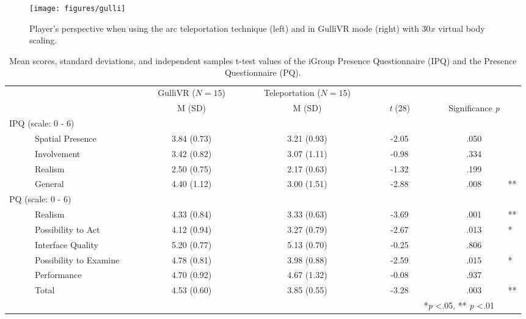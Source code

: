 \documentclass{sigchi}
\begin{document}
\begin{figure}
\centering
\texttt{[image: figures/gulli]}
\caption{Player's perspective when using the arc teleportation technique (left) and in GulliVR mode (right) with 30$x$ virtual body scaling.}
\label{fig:gulli}
\end{figure}

\begin{table*}[t]
  \caption{Mean scores, standard deviations, and independent samples t-test values of the iGroup Presence Questionnaire (IPQ) and the Presence Questionnaire (PQ).}
  \label{tab:IPQ}
  \begin{tabular}{lccccl}
    \toprule
     & ~~~~~~~GulliVR ($N = 15$) & ~~~~~~~Teleportation ($N = 15$) & ~~~~~~~ & ~~~~~~~ &\\
     \addlinespace 
      & ~~~~~~~M (SD)	& ~~~~~~~M (SD) & ~~~~~~~\textit{t} (28) & ~~~~~~~Significance \textit{p} & \\
    \midrule
    IPQ (scale: 0 - 6)\\
    \ \ \ \ \ \ Spatial Presence & ~~~~~~~3.84 (0.73) & ~~~~~~~3.21 (0.93) & ~~~~~~~-2.05 & ~~~~~~~.050 & \\
    \ \ \ \ \ \ Involvement & ~~~~~~~3.42 (0.82) & ~~~~~~~3.07 (1.11) & ~~~~~~~-0.98 & ~~~~~~~.334 &\\
    \ \ \ \ \ \ Realism & ~~~~~~~2.50 (0.75) & ~~~~~~~2.17 (0.63) & ~~~~~~~-1.32 & ~~~~~~~.199 &\\
    \ \ \ \ \ \ General & ~~~~~~~4.40 (1.12) & ~~~~~~~3.00 (1.51) & ~~~~~~~-2.88 & ~~~~~~~.008& **\\
    PQ (scale: 0 - 6)\\
    \ \ \ \ \ \ Realism & ~~~~~~~4.33 (0.84) & ~~~~~~~3.33 (0.63) & ~~~~~~~-3.69 & ~~~~~~~.001 & **\\
    \ \ \ \ \ \ Possibility to Act & ~~~~~~~4.12 (0.94) & ~~~~~~~3.27 (0.79) & ~~~~~~~-2.67 & ~~~~~~~.013& *\\
    \ \ \ \ \ \ Interface Quality & ~~~~~~~5.20 (0.77) & ~~~~~~~5.13 (0.70) & ~~~~~~~-0.25 & ~~~~~~~.806&\\
    \ \ \ \ \ \ Possibility to Examine & ~~~~~~~4.78 (0.81) & ~~~~~~~3.98 (0.88) & ~~~~~~~-2.59 & ~~~~~~~.015 & *\\
    \ \ \ \ \ \ Performance & ~~~~~~~4.70 (0.92) & ~~~~~~~4.67 (1.32) & ~~~~~~~-0.08 & ~~~~~~~.937 &\\
    \ \ \ \ \ \ Total & ~~~~~~~4.53 (0.60) & ~~~~~~~3.85 (0.55) & ~~~~~~~-3.28 & ~~~~~~~.003 & **\\
  \bottomrule
  &&&&*\textit{p} <.05, ** \textit{p} <.01
\end{tabular}
\end{table*}
\end{document}
